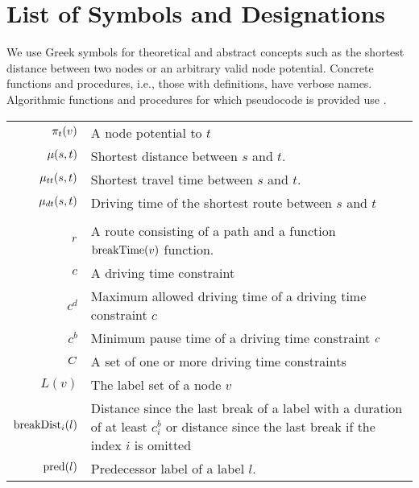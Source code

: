 \section{List of Symbols and Designations}
\label{app:symbols}

We use Greek symbols for theoretical and abstract concepts such as the shortest distance between two nodes or an arbitrary valid node potential. Concrete functions and procedures, i.e., those with definitions, have verbose names. Algorithmic functions and procedures for which pseudocode is provided use .

\begin{tabular}{rp{}}
	$\pi_t(v)$         & A node potential to $t$                                                                                                                   \\
	$\mu(s,t)$          & Shortest distance between $s$ and $t$.                                                                                                    \\
	$\mu_{tt}(s,t)$        & Shortest travel time between $s$ and $t$.                                                                                                 \\
	$\mu_{dt}(s,t)$       & Driving time of the shortest route between $s$ and $t$                                                                                    \\
	\\
	$r$                  & A route consisting of a path and a function $\operatorname{breakTime}(v)$ function.                                                                     \\
	$c$                  & A driving time constraint                                                                                                                 \\
	$c^d$                     & Maximum allowed driving time of a driving time constraint $c$                                                                             \\
	$c^b$                     & Minimum pause time of a driving time constraint $c$                                                                                  \\
	$C$               & A set of one or more driving time constraints                                                                                             \\
	$L(v)$                    & The label set of a node $v$                                                                                                               \\
	$\operatorname{breakDist}_i(l)$         & Distance since the last break of a label with a duration of at least $c_i^b$ or distance since the last break if the index $i$ is omitted \\
	$\operatorname{pred}(l)$                & Predecessor label of a label $l$.                                                                                                         \\


\end{tabular}
